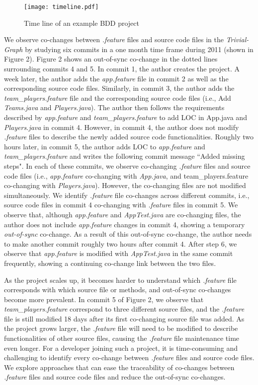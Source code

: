 \begin{figure*}
	\centering
	\texttt{[image: timeline.pdf]}
	\caption{Time line of an example BDD project}
\end{figure*} 
We observe co-changes between \textit{.feature} files and source code files in the \textit{Trivial-Graph} by studying six commits in a one month time frame during 2011 (shown in Figure 2). Figure 2 shows an out-of-sync co-change in the dotted lines surrounding commits 4 and 5. In commit 1, the author creates the project. A week later, the author adds the \textit{app.feature} file in commit 2 as well as the corresponding source code files. Similarly, in commit 3, the author adds the \textit{team\_players.feature} file and the corresponding source code files (i.e., Add \textit{Teams.java} and \textit{Players.java}). The author then follows the requirements described by \textit{app.feature} and \textit{team\_players.feature} to add LOC in App.java and \textit{Players.java} in commit 4. However, in commit 4, the author does not modify \textit{.feature} files to describe the newly added source code functionalities. Roughly two hours later, in commit 5, the author adds LOC to \textit{app.feature} and \textit{team\_players.feature} and writes the following commit message ``Added missing steps". In each of these commits, we observe co-changing \textit{.feature} files and source code files (i.e., \textit{app.feature} co-changing with \textit{App.java}, and team\_players.feature co-changing with \textit{Players.java}). However, the co-changing files are not modified simultaneously. We identify \textit{.feature} file co-changes across different commits, i.e., source code files in commit 4 co-changing with \textit{.feature} files in commit 5. We observe that, although\textit{ app.feature} and \textit{AppTest.java} are co-changing files, the author does not include \textit{app.feature} changes in commit 4, showing a temporary \textit{out-of-sync} co-change. As a result of this out-of-sync co-change, the author needs to make another commit roughly two hours after commit 4. After step 6, we observe that \textit{app.feature} is modified with \textit{AppTest.java} in the same commit frequently, showing a continuing co-change link between the two files.

As the project scales up, it becomes harder to understand which \textit{.feature} file corresponds with which source file or methods, and out-of-sync co-changes become more prevalent. In commit 5 of Figure 2, we observe that \textit{team\_players.feature} correspond to three different source files, and the \textit{.feature} file is still modified 18 days after its first co-changing source file was added. As the project grows larger, the \textit{.feature} file will need to be modified to describe functionalities of other source files, causing the \textit{.feature} file maintenance time even longer. For a developer joining such a project, it is time-consuming and challenging to identify every co-change between \textit{.feature} files and source code files. We explore approaches that can ease the traceability of co-changes between \textit{.feature} files and source code files and reduce the out-of-sync co-changes. 
